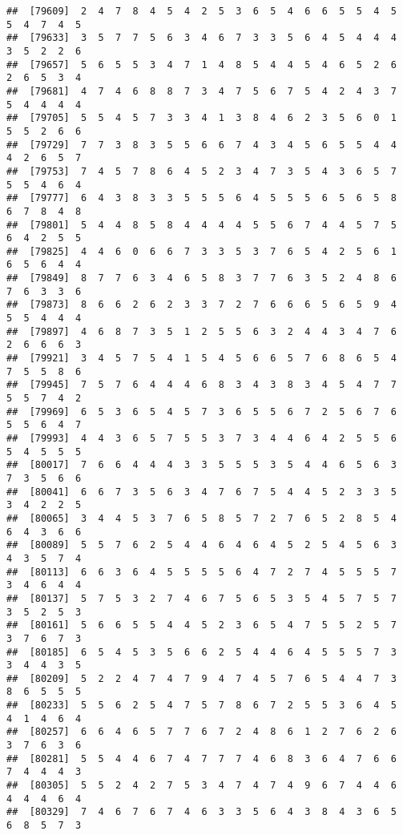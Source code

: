 \documentclass[
]{book}
\begin{document}
\begin{verbatim}
##  [79609]  2  4  7  8  4  5  4  2  5  3  6  5  4  6  6  5  5  4  5  5  4  7  4  5
##  [79633]  3  5  7  7  5  6  3  4  6  7  3  3  5  6  4  5  4  4  4  3  5  2  2  6
##  [79657]  5  6  5  5  3  4  7  1  4  8  5  4  4  5  4  6  5  2  6  2  6  5  3  4
##  [79681]  4  7  4  6  8  8  7  3  4  7  5  6  7  5  4  2  4  3  7  5  4  4  4  4
##  [79705]  5  5  4  5  7  3  3  4  1  3  8  4  6  2  3  5  6  0  1  5  5  2  6  6
##  [79729]  7  7  3  8  3  5  5  6  6  7  4  3  4  5  6  5  5  4  4  4  2  6  5  7
##  [79753]  7  4  5  7  8  6  4  5  2  3  4  7  3  5  4  3  6  5  7  5  5  4  6  4
##  [79777]  6  4  3  8  3  3  5  5  5  6  4  5  5  5  6  5  6  5  8  6  7  8  4  8
##  [79801]  5  4  4  8  5  8  4  4  4  4  5  5  6  7  4  4  5  7  5  6  4  2  5  5
##  [79825]  4  4  6  0  6  6  7  3  3  5  3  7  6  5  4  2  5  6  1  6  5  6  4  4
##  [79849]  8  7  7  6  3  4  6  5  8  3  7  7  6  3  5  2  4  8  6  7  6  3  3  6
##  [79873]  8  6  6  2  6  2  3  3  7  2  7  6  6  6  5  6  5  9  4  5  5  4  4  4
##  [79897]  4  6  8  7  3  5  1  2  5  5  6  3  2  4  4  3  4  7  6  2  6  6  6  3
##  [79921]  3  4  5  7  5  4  1  5  4  5  6  6  5  7  6  8  6  5  4  7  5  5  8  6
##  [79945]  7  5  7  6  4  4  4  6  8  3  4  3  8  3  4  5  4  7  7  5  5  7  4  2
##  [79969]  6  5  3  6  5  4  5  7  3  6  5  5  6  7  2  5  6  7  6  5  5  6  4  7
##  [79993]  4  4  3  6  5  7  5  5  3  7  3  4  4  6  4  2  5  5  6  5  4  5  5  5
##  [80017]  7  6  6  4  4  4  3  3  5  5  5  3  5  4  4  6  5  6  3  7  3  5  6  6
##  [80041]  6  6  7  3  5  6  3  4  7  6  7  5  4  4  5  2  3  3  5  3  4  2  2  5
##  [80065]  3  4  4  5  3  7  6  5  8  5  7  2  7  6  5  2  8  5  4  6  4  3  6  6
##  [80089]  5  5  7  6  2  5  4  4  6  4  6  4  5  2  5  4  5  6  3  4  3  5  7  4
##  [80113]  6  6  3  6  4  5  5  5  5  6  4  7  2  7  4  5  5  5  7  3  4  6  4  4
##  [80137]  5  7  5  3  2  7  4  6  7  5  6  5  3  5  4  5  7  5  7  3  5  2  5  3
##  [80161]  5  6  6  5  5  4  4  5  2  3  6  5  4  7  5  5  2  5  7  3  7  6  7  3
##  [80185]  6  5  4  5  3  5  6  6  2  5  4  4  6  4  5  5  5  7  3  3  4  4  3  5
##  [80209]  5  2  2  4  7  4  7  9  4  7  4  5  7  6  5  4  4  7  3  8  6  5  5  5
##  [80233]  5  5  6  2  5  4  7  5  7  8  6  7  2  5  5  3  6  4  5  4  1  4  6  4
##  [80257]  6  6  4  6  5  7  7  6  7  2  4  8  6  1  2  7  6  2  6  3  7  6  3  6
##  [80281]  5  5  4  4  6  7  4  7  7  7  4  6  8  3  6  4  7  6  6  7  4  4  4  3
##  [80305]  5  5  2  4  2  7  5  3  4  7  4  7  4  9  6  7  4  4  6  4  4  4  6  4
##  [80329]  7  4  6  7  6  7  4  6  3  3  5  6  4  3  8  4  3  6  5  6  8  5  7  3

\end{verbatim}
\end{document}

